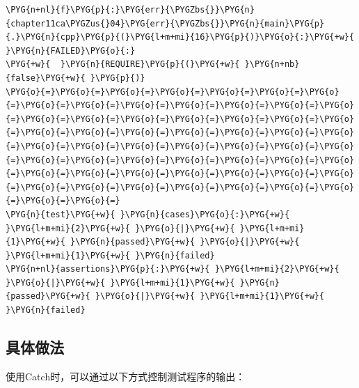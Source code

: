\begin{codeblockbg}
\begin{Verbatim}[commandchars=\\\{\},breaklines=true,breakanywhere=true,fontsize=\codefont,xleftmargin=17bp]
\PYG{n+nl}{f}\PYG{p}{:}\PYG{err}{\PYGZbs{}}\PYG{n}{chapter11ca\PYGZus{}04}\PYG{err}{\PYGZbs{}}\PYG{n}{main}\PYG{p}{.}\PYG{n}{cpp}\PYG{p}{(}\PYG{l+m+mi}{16}\PYG{p}{)}\PYG{o}{:}\PYG{+w}{ }\PYG{n}{FAILED}\PYG{o}{:}
\PYG{+w}{  }\PYG{n}{REQUIRE}\PYG{p}{(}\PYG{+w}{ }\PYG{n+nb}{false}\PYG{+w}{ }\PYG{p}{)}
\PYG{o}{=}\PYG{o}{=}\PYG{o}{=}\PYG{o}{=}\PYG{o}{=}\PYG{o}{=}\PYG{o}{=}\PYG{o}{=}\PYG{o}{=}\PYG{o}{=}\PYG{o}{=}\PYG{o}{=}\PYG{o}{=}\PYG{o}{=}\PYG{o}{=}\PYG{o}{=}\PYG{o}{=}\PYG{o}{=}\PYG{o}{=}\PYG{o}{=}\PYG{o}{=}\PYG{o}{=}\PYG{o}{=}\PYG{o}{=}\PYG{o}{=}\PYG{o}{=}\PYG{o}{=}\PYG{o}{=}\PYG{o}{=}\PYG{o}{=}\PYG{o}{=}\PYG{o}{=}\PYG{o}{=}\PYG{o}{=}\PYG{o}{=}\PYG{o}{=}\PYG{o}{=}\PYG{o}{=}\PYG{o}{=}\PYG{o}{=}\PYG{o}{=}\PYG{o}{=}\PYG{o}{=}\PYG{o}{=}\PYG{o}{=}\PYG{o}{=}\PYG{o}{=}\PYG{o}{=}\PYG{o}{=}\PYG{o}{=}\PYG{o}{=}\PYG{o}{=}\PYG{o}{=}\PYG{o}{=}\PYG{o}{=}\PYG{o}{=}\PYG{o}{=}\PYG{o}{=}
\PYG{n}{test}\PYG{+w}{ }\PYG{n}{cases}\PYG{o}{:}\PYG{+w}{ }\PYG{l+m+mi}{2}\PYG{+w}{ }\PYG{o}{|}\PYG{+w}{ }\PYG{l+m+mi}{1}\PYG{+w}{ }\PYG{n}{passed}\PYG{+w}{ }\PYG{o}{|}\PYG{+w}{ }\PYG{l+m+mi}{1}\PYG{+w}{ }\PYG{n}{failed}
\PYG{n+nl}{assertions}\PYG{p}{:}\PYG{+w}{ }\PYG{l+m+mi}{2}\PYG{+w}{ }\PYG{o}{|}\PYG{+w}{ }\PYG{l+m+mi}{1}\PYG{+w}{ }\PYG{n}{passed}\PYG{+w}{ }\PYG{o}{|}\PYG{+w}{ }\PYG{l+m+mi}{1}\PYG{+w}{ }\PYG{n}{failed}
\end{Verbatim}
\end{codeblockbg}



\subsection{具体做法}



使用Catch时，可以通过以下方式控制测试程序的输出：



